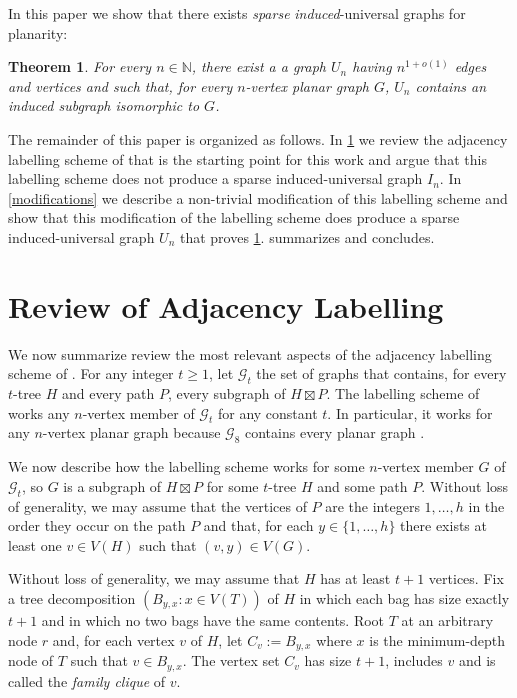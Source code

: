 \documentclass{patmorin}
\newcommand{\N}{\mathbb{N}}
\newtheorem{theorem}{Theorem}
\begin{document}
In this paper we show that there exists \emph{sparse} \emph{induced}-universal graphs for planarity:

\begin{theorem}\label{main-planar}
    For every $n\in\N$, there exist a a graph $U_n$ having $n^{1+o(1)}$ edges and vertices and such that, for every $n$-vertex planar graph $G$, $U_n$ contains an induced subgraph isomorphic to $G$.
\end{theorem}

The remainder of this paper is organized as follows. In \cref{review} we review the adjacency labelling scheme of \cite{dujmovic.esperet.ea:adjacency} that is the starting point for this work and argue that this labelling scheme does not produce a sparse induced-universal graph $I_n$.  In \cref{modifications} we describe a non-trivial modification of this labelling scheme and show that this modification of the labelling scheme does produce a sparse induced-universal graph $U_n$ that proves \cref{main-planar}.   summarizes and concludes.



\section{Review of Adjacency Labelling}
\label{review}

We now summarize review the most relevant aspects of the adjacency labelling scheme of \citet{dujmovic.esperet.ea:adjacency}.  For any integer $t\ge 1$, let $\mathcal{G}_t$ the set of graphs that contains, for every $t$-tree $H$ and every path $P$, every subgraph of $H\boxtimes P$.  The labelling scheme of \citet{dujmovic.esperet.ea:adjacency} works any $n$-vertex member of $\mathcal{G}_t$ for any constant $t$.  In particular, it works for any $n$-vertex planar graph because $\mathcal{G}_8$ contains every planar graph \cite[Theorem~36]{dujmovic.joret.ea:planar}.

We now describe how the labelling scheme works for some $n$-vertex member $G$ of $\mathcal{G}_t$, so $G$ is a subgraph of $H\boxtimes P$ for some $t$-tree $H$ and some path $P$.  Without loss of generality, we may assume that the vertices of $P$ are the integers $1,\ldots,h$ in the order they occur on the path $P$ and that, for each $y\in\{1,\ldots,h\}$ there exists at least one $v\in V(H)$ such that $(v,y)\in V(G)$.

Without loss of generality, we may assume that $H$ has at least $t+1$ vertices. Fix a tree decomposition $(B_{y,x}:x\in V(T))$ of $H$ in which each bag has size exactly $t+1$ and in which no two bags have the same contents.  Root $T$ at an arbitrary node $r$ and, for each vertex $v$ of $H$, let $C_v:=B_{y,x}$ where $x$ is the minimum-depth node of $T$ such that $v\in B_{y,x}$.  The vertex set $C_v$ has size $t+1$, includes $v$ and is called the \emph{family clique} of $v$.
\end{document}
